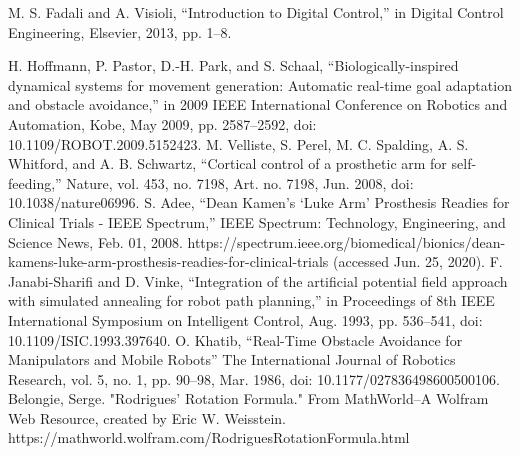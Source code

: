 \documentclass[a4paper, 10pt, conference]{ieeeconf}      %
\begin{document}
\begin{thebibliography}{99}

 M. S. Fadali and A. Visioli, “Introduction to Digital Control,” in Digital Control Engineering, Elsevier, 2013, pp. 1–8.


 H. Hoffmann, P. Pastor, D.-H. Park, and S. Schaal, “Biologically-inspired dynamical systems for movement generation: Automatic real-time goal adaptation and obstacle avoidance,” in 2009 IEEE International Conference on Robotics and Automation, Kobe, May 2009, pp. 2587–2592, doi: 10.1109/ROBOT.2009.5152423.
 M. Velliste, S. Perel, M. C. Spalding, A. S. Whitford, and A. B. Schwartz, “Cortical control of a prosthetic arm for self-feeding,” Nature, vol. 453, no. 7198, Art. no. 7198, Jun. 2008, doi: 10.1038/nature06996.
 S. Adee, “Dean Kamen’s ‘Luke Arm’ Prosthesis Readies for Clinical Trials - IEEE Spectrum,” IEEE Spectrum: Technology, Engineering, and Science News, Feb. 01, 2008. https://spectrum.ieee.org/biomedical/bionics/dean-kamens-luke-arm-prosthesis-readies-for-clinical-trials (accessed Jun. 25, 2020).
 F. Janabi-Sharifi and D. Vinke, “Integration of the artificial potential field approach with simulated annealing for robot path planning,” in Proceedings of 8th IEEE International Symposium on Intelligent Control, Aug. 1993, pp. 536–541, doi: 10.1109/ISIC.1993.397640.
 O. Khatib, “Real-Time Obstacle Avoidance for Manipulators and Mobile Robots” The International Journal of Robotics Research, vol. 5, no. 1, pp. 90–98, Mar. 1986, doi: 10.1177/027836498600500106.
  Belongie, Serge. "Rodrigues' Rotation Formula." From MathWorld--A Wolfram Web Resource, created by Eric W. Weisstein. https://mathworld.wolfram.com/RodriguesRotationFormula.html 



\end{thebibliography}
\end{document}

